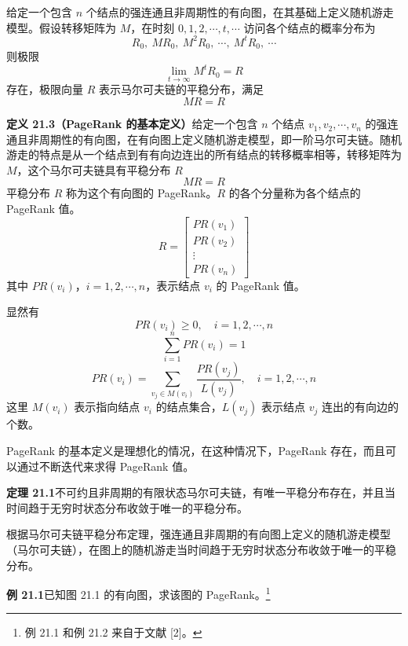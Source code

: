 \documentclass[UTF8,12pt,a4paper,fontset=fandol]{ctexart}
\begin{document}
给定一个包含 $n$ 个结点的强连通且非周期性的有向图，在其基础上定义随机游走模型。假设转移矩阵为 $M$，在时刻 $0,1,2,\cdots,t,\cdots$ 访问各个结点的概率分布为
\[
R_0,\ MR_0,\ M^2R_0,\ \cdots,\ M^tR_0,\ \cdots
\]
则极限
\begin{equation}
\lim_{t\to\infty}M^tR_0=R
\tag{21.5}
\end{equation}
存在，极限向量 $R$ 表示马尔可夫链的平稳分布，满足
\[
MR=R
\]

\noindent\textbf{定义 21.3（PageRank 的基本定义）}\quad 给定一个包含 $n$ 个结点 $v_1,v_2,\cdots,v_n$ 的强连通且非周期性的有向图，在有向图上定义随机游走模型，即一阶马尔可夫链。随机游走的特点是从一个结点到有有向边连出的所有结点的转移概率相等，转移矩阵为 $M$，这个马尔可夫链具有平稳分布 $R$
\begin{equation}
MR=R
\tag{21.6}
\end{equation}
平稳分布 $R$ 称为这个有向图的 PageRank。$R$ 的各个分量称为各个结点的 PageRank 值。
\[
R=
\begin{bmatrix}
PR(v_1)\\
PR(v_2)\\
\vdots\\
PR(v_n)
\end{bmatrix}
\]
其中 $PR(v_i)$，$i=1,2,\cdots,n$，表示结点 $v_i$ 的 PageRank 值。

显然有
\begin{equation}
PR(v_i)\geqslant 0,\quad i=1,2,\cdots,n
\tag{21.7}
\end{equation}
\begin{equation}
\sum_{i=1}^n PR(v_i)=1
\tag{21.8}
\end{equation}
\begin{equation}
PR(v_i)=\sum_{v_j\in M(v_i)}\frac{PR(v_j)}{L(v_j)},\quad i=1,2,\cdots,n
\tag{21.9}
\end{equation}
这里 $M(v_i)$ 表示指向结点 $v_i$ 的结点集合，$L(v_j)$ 表示结点 $v_j$ 连出的有向边的个数。

PageRank 的基本定义是理想化的情况，在这种情况下，PageRank 存在，而且可以通过不断迭代来求得 PageRank 值。

\noindent\textbf{定理 21.1}\quad 不可约且非周期的有限状态马尔可夫链，有唯一平稳分布存在，并且当时间趋于无穷时状态分布收敛于唯一的平稳分布。

根据马尔可夫链平稳分布定理，强连通且非周期的有向图上定义的随机游走模型（马尔可夫链），在图上的随机游走当时间趋于无穷时状态分布收敛于唯一的平稳分布。

\noindent\textbf{例 21.1}\quad 已知图 21.1 的有向图，求该图的 PageRank。\footnote{例 21.1 和例 21.2 来自于文献 [2]。}
\end{document}
